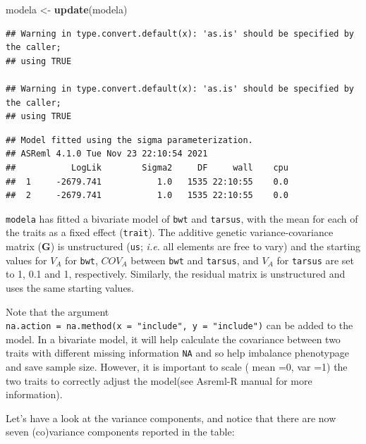 \documentclass[
  12pt,
]{book}
\newenvironment{Shaded}{\begin{snugshade}}{\end{snugshade}}
\newcommand{\KeywordTok}[1]{\textcolor[rgb]{0.13,0.29,0.53}{\textbf{#1}}}
\newcommand{\NormalTok}[1]{#1}
\newcommand{\OperatorTok}[1]{\textcolor[rgb]{0.81,0.36,0.00}{\textbf{#1}}}
\newcommand{\StringTok}[1]{\textcolor[rgb]{0.31,0.60,0.02}{#1}}
\begin{document}
\begin{Shaded}
\begin{Highlighting}[]
\NormalTok{modela \textless{}{-}}\StringTok{ }\KeywordTok{update}\NormalTok{(modela)}
\end{Highlighting}
\end{Shaded}

\begin{verbatim}
## Warning in type.convert.default(x): 'as.is' should be specified by the caller;
## using TRUE

## Warning in type.convert.default(x): 'as.is' should be specified by the caller;
## using TRUE
\end{verbatim}

\begin{verbatim}
## Model fitted using the sigma parameterization.
## ASReml 4.1.0 Tue Nov 23 22:10:54 2021
##           LogLik        Sigma2     DF     wall    cpu
##  1     -2679.741           1.0   1535 22:10:55    0.0
##  2     -2679.741           1.0   1535 22:10:55    0.0
\end{verbatim}

\texttt{modela} has fitted a bivariate model of \texttt{bwt} and \texttt{tarsus}, with the mean for each of the traits as a fixed effect (\texttt{trait}). The additive genetic variance-covariance matrix (\(\textbf{G}\)) is unstructured (\texttt{us}; \emph{i.e.} all elements are free to vary) and the starting values for \(V_A\) for \texttt{bwt}, \(COV_A\) between \texttt{bwt} and \texttt{tarsus}, and \(V_A\) for \texttt{tarsus} are set to 1, 0.1 and 1, respectively. Similarly, the residual matrix is unstructured and uses the same starting values.

Note that the argument \texttt{na.action\ =\ na.method(x\ =\ "include",\ y\ =\ "include")} can be added to the model. In a bivariate model, it will help calculate the covariance between two traits with different missing information \texttt{NA} and so help imbalance phenotypage and save sample size. However, it is important to scale ( mean =0, var =1) the two traits to correctly adjust the model(see Asreml-R manual for more information).

Let's have a look at the variance components, and notice that there are now seven (co)variance components reported in the table:

\begin{Shaded}
\end{Shaded}
\end{document}
